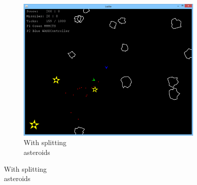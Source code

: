 \begin{figure}
\begin{subfigure}[b]{0.45\textwidth}
		\center
		\includegraphics[scale=0.51]{resources/gamemode0}
		\caption{With splitting\\asteroids}
	\end{subfigure}
\end{figure}
	